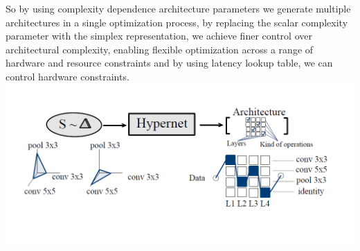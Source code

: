 \documentclass{article}
\begin{document}
So by using complexity dependence architecture parameters we generate multiple architectures in a single optimization process, by replacing the scalar complexity parameter with the simplex representation, we achieve finer control over architectural complexity, enabling flexible optimization across a range of hardware and resource constraints and by using latency lookup table, we can control hardware constraints.  \\

\includegraphics[width=1\linewidth]{picture.png}



\end{document}
